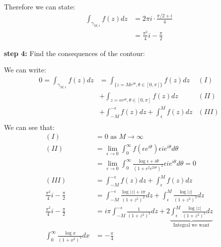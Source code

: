 \begin{example}
    Therefore we can state:
    \begin{align}
        \int_{\gamma_{M,\epsilon}} f(z)dz & = 2\pi i \cdot \frac{\pi/2 + i}{4} \\
                                          & = \frac{\pi^2}{4}i - \frac{\pi}{2}
    \end{align}

    \textbf{step 4:} Find the consequences of the contour:

    We can write:
    \begin{align*}
        0 = \int_{\gamma_{M,\epsilon}} f(z)dz & = \int_{\{z=Me^{i\theta}, \theta \in [0, \pi]\}} f(z)dz       & (I)   \\
                                              & + \int_{z = \epsilon e^{i\theta}, \theta \in [0, \pi]} f(z)dz & (II)  \\
                                              & + \int_{-M}^{-\epsilon} f(z)dz + \int_{\epsilon}^{M} f(z)dz   & (III) \\
    \end{align*}
    We can see that:
    \begin{align}
        (I)                                             & = 0 \text{ as } M \to \infty                                                                                                                     \\
        (II)                                            & = \lim_{\epsilon \to 0}\int_{0}^{\infty} f(\epsilon e^{i \theta})\epsilon i e^{i \theta} d\theta                                                 \\
                                                        & = \lim_{\epsilon \to 0} \int_{0}^{\infty} \frac{\log \epsilon + i\theta}{(1 + \epsilon^2 e^{2i\theta})^2} \epsilon i e^{i \theta} d\theta = 0    \\
        (III)                                           & = \int_{-M}^{-\epsilon} f(z)dz + \int_{\epsilon}^{M} f(z)dz                                                                                      \\
        \frac{\pi^2}{4}i - \frac{\pi}{2}                & =\int_{-M}^{-\epsilon} \frac{\log |z| + i\pi}{(1 + z^2)^2}dz + \int_{\epsilon}^{M} \frac{\log |z|}{(1 + z^2)^2}dz                                \\
        \frac{\pi^2}{4}i - \frac{\pi}{2}                & =i\pi \int_{-M}^{-\epsilon} \frac{1}{(1 + z^2)^2}dz + 2\underbrace{\int_{\epsilon}^{M} \frac{\log |z|}{(1 + z^2)^2}dz}_{\text{Integral we want}} \\
        \int_{0}^{\infty} \frac{\log x}{(1 + x^2)^2} dx & = -\frac{\pi}{4}
    \end{align}
\end{example}